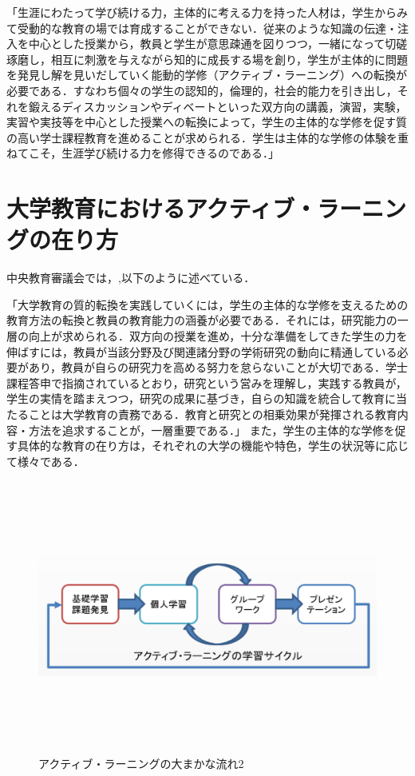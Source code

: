 「生涯にわたって学び続ける力，主体的に考える力を持った人材は，学生からみて受動的な教育の場では育成することができない．従来のような知識の伝達・注入を中心とした授業から，教員と学生が意思疎通を図りつつ，一緒になって切磋琢磨し，相互に刺激を与えながら知的に成長する場を創り，学生が主体的に問題を発見し解を見いだしていく能動的学修（アクティブ・ラーニング）への転換が必要である．すなわち個々の学生の認知的，倫理的，社会的能力を引き出し，それを鍛えるディスカッションやディベートといった双方向の講義，演習，実験，実習や実技等を中心とした授業への転換によって，学生の主体的な学修を促す質の高い学士課程教育を進めることが求められる．学生は主体的な学修の体験を重ねてこそ，生涯学び続ける力を修得できるのである．」


\section{大学教育におけるアクティブ・ラーニングの在り方}
中央教育審議会では，,以下のように述べている．

「大学教育の質的転換を実践していくには，学生の主体的な学修を支えるための教育方法の転換と教員の教育能力の涵養が必要である．それには，研究能力の一層の向上が求められる．双方向の授業を進め，十分な準備をしてきた学生の力を伸ばすには，教員が当該分野及び関連諸分野の学術研究の動向に精通している必要があり，教員が自らの研究力を高める努力を怠らないことが大切である．学士課程答申で指摘されているとおり，研究という営みを理解し，実践する教員が，学生の実情を踏まえつつ，研究の成果に基づき，自らの知識を統合して教育に当たることは大学教育の責務である．教育と研究との相乗効果が発揮される教育内容・方法を追求することが，一層重要である．」
また，学生の主体的な学修を促す具体的な教育の在り方は，それぞれの大学の機能や特色，学生の状況等に応じて様々である．


\begin{figure}[h]
\centering
\includegraphics[height=9cm,width=13cm]{sozai3.pdf}
\caption{アクティブ・ラーニングの大まかな流れ2}\label{サンプル図}
\end{figure}

